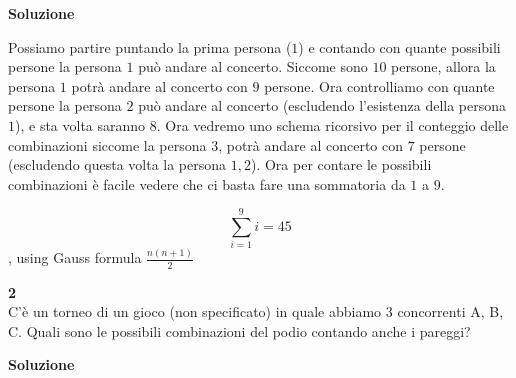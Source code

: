 \documentclass[11pt]{article}
\begin{document}
            \textbf{\large Soluzione}

            Possiamo partire puntando la prima persona ($1$) e contando con quante possibili persone la persona $1$ pu\`o andare al concerto. Siccome sono $10$ persone, allora la persona $1$ potr\`a andare al concerto con $9$ persone.
            Ora controlliamo con quante persone la persona $2$ pu\`o andare al concerto (escludendo l'esistenza della persona $1$), e sta volta saranno $8$.
            Ora vedremo uno schema ricorsivo per il conteggio delle combinazioni siccome la persona $3$, potr\`a andare al concerto con $7$ persone (escludendo questa volta la persona $1, 2$).
            Ora per contare le possibili combinazioni \`e facile vedere che ci basta fare una sommatoria da $1$ a $9$.

		\[
            \sum_{i=1}^{9}i = 45
		\]
			, using Gauss formula $\frac{n(n+1)}{2}$

            \textbf{\large 2}\\
            C'è un torneo di un gioco (non specificato) in quale abbiamo 3 concorrenti A, B, C. Quali sono le possibili combinazioni del podio contando anche i pareggi?

            \textbf{\large Soluzione}
\end{document}
